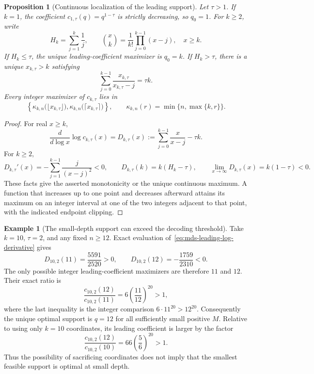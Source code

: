 \documentclass[11pt]{article}
\newtheorem{proposition}[theorem]{Proposition}
\theoremstyle{definition}
\newtheorem{example}[theorem]{Example}
\theoremstyle{remark}
\newcommand{\1}{\mathbf 1}
\begin{document}
\begin{proposition}[Continuous localization of the leading support]
\label{prop:mds-leading-localization}
Let \(\tau>1\).  If \(k=1\), the coefficient
\(c_{1,\tau}(q)=q^{1-\tau}\) is strictly decreasing, so \(q_0=1\).
For \(k\ge2\), write
\[
  H_k=\sum_{j=1}^k\frac1j,
  \qquad
  \binom{x}{k}=\frac1{k!}\prod_{j=0}^{k-1}(x-j),\quad x\ge k.
\]
If \(H_k\le\tau\), the unique leading-coefficient maximizer is
\(q_0=k\).  If \(H_k>\tau\), there is a unique \(x_{k,\tau}>k\)
satisfying
\begin{equation}\label{eq:mds-leading-critical}
  \sum_{j=0}^{k-1}\frac{x_{k,\tau}}{x_{k,\tau}-j}=\tau k.
\end{equation}
Every integer maximizer of \(c_{k,\tau}\) lies in
\begin{equation}\label{eq:mds-leading-neighbors}
  \left\{
    \kappa_{k,n}\bigl(\lfloor x_{k,\tau}\rfloor\bigr),
    \kappa_{k,n}\bigl(\lceil x_{k,\tau}\rceil\bigr)
  \right\},
  \qquad
  \kappa_{k,n}(r)=\min\{n,\max\{k,r\}\}.
\end{equation}
\end{proposition}

\begin{proof}
For real \(x\ge k\),
\begin{equation}\label{eq:mds-leading-log-derivative}
  \frac{d}{d\log x}\log c_{k,\tau}(x)
  =D_{k,\tau}(x)
  :=\sum_{j=0}^{k-1}\frac{x}{x-j}-\tau k.
\end{equation}
For \(k\ge2\),
\[
  D_{k,\tau}'(x)
  =-\sum_{j=1}^{k-1}\frac{j}{(x-j)^2}<0,
  \qquad
  D_{k,\tau}(k)=k(H_k-\tau),
  \qquad
  \lim_{x\to\infty}D_{k,\tau}(x)=k(1-\tau)<0.
\]
These facts give the asserted monotonicity or the unique continuous
maximum.  A function that increases up to one point and decreases
afterward attains its maximum on an integer interval at one of the two
integers adjacent to that point, with the indicated endpoint clipping.
\end{proof}

\begin{example}[The small-depth support can exceed the decoding threshold]
\label{ex:mds-small-depth-twelve}
Take \(k=10\), \(\tau=2\), and any fixed \(n\ge12\).  Exact evaluation
of~\eqref{eq:mds-leading-log-derivative} gives
\[
  D_{10,2}(11)=\frac{5591}{2520}>0,
  \qquad
  D_{10,2}(12)=-\frac{1759}{2310}<0.
\]
The only possible integer leading-coefficient maximizers are therefore
\(11\) and \(12\).  Their exact ratio is
\[
  \frac{c_{10,2}(12)}{c_{10,2}(11)}
  =6\left(\frac{11}{12}\right)^{20}>1,
\]
where the last inequality is the integer comparison
\(6\cdot11^{20}>12^{20}\).  Consequently the unique optimal support
is \(q=12\) for all sufficiently small positive \(M\).  Relative to
using only \(k=10\) coordinates, its leading coefficient is larger by
the factor
\[
  \frac{c_{10,2}(12)}{c_{10,2}(10)}
  =66\left(\frac56\right)^{20}>1.
\]
Thus the possibility of sacrificing coordinates does not imply that
the smallest feasible support is optimal at small depth.
\end{example}
\end{document}
